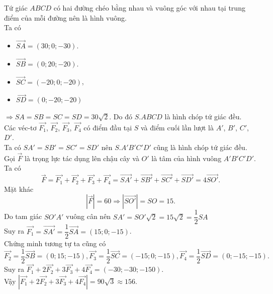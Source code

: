 \begin{bt}
{\begin{center}
	\end{center}
Tứ giác $ABCD$ có hai đường chéo bằng nhau và vuông góc với nhau tại trung điểm của mỗi đường nên là hình vuông.\\
Ta có
\begin{itemize}
	\item $\overrightarrow{SA}=\left(30;0;-30\right)$.
	\item $\overrightarrow{SB}=\left(0;20;-20\right)$.
	\item $\overrightarrow{SC}=\left(-20;0;-20\right)$,
	\item $\overrightarrow{SD}=\left(0;-20;-20\right)$
\end{itemize} 
$\Rightarrow SA=SB=SC=SD=30\sqrt{2}$. Do đó $S.ABCD$ là hình chóp tứ giác đều.\\
Các véc-tơ $\overrightarrow{F_1}$, $\overrightarrow{F_2}$, $\overrightarrow{F_3}$, $\overrightarrow{F_4}$ có điểm đầu tại $S$ và điểm cuối lần lượt là $A'$, $B'$, $C'$, $D'$.\\
Ta có $SA'=SB'=SC'=SD' $ nên $S.A'B'C'D'$ cũng là hình chóp tứ giác đều.\\
Gọi $\overrightarrow{F}$ là trọng lực tác dụng lên chậu cây và $O'$ là tâm của hình vuông $A'B'C'D'$. Ta có 
	\[\overrightarrow{F}=\overrightarrow{F_1}+\overrightarrow{F_2}+\overrightarrow{F_3}+\overrightarrow{F_4}=\overrightarrow{SA'}+\overrightarrow{SB'}+\overrightarrow{SC'}+\overrightarrow{SD'}=4\overrightarrow{SO'}.\]
Mặt khác
		\[\left|\overrightarrow{F}\right|=60\Rightarrow \left|\overrightarrow{SO'}\right|=SO=15.\]
		Do tam giác $SO'A'$ vuông cân nên $SA'=SO'\sqrt{2}=15\sqrt{2}=\dfrac{1}{2} SA$\\
		Suy ra $\overrightarrow{F_1}=\overrightarrow{SA'}=\dfrac{1}{2} \overrightarrow{SA}=\left(15;0;-15\right)$.\\
		Chứng minh tương tự ta cũng có
		\[\overrightarrow{F_2}=\dfrac{1}{2} \overrightarrow{SB}=\left(0;15;-15\right),\overrightarrow{F_3}=\dfrac{1}{2} \overrightarrow{SC}=\left(-15;0;-15\right),\overrightarrow{F_4}=\dfrac{1}{2} \overrightarrow{SD}=\left(0;-15;-15\right).
		\]
		Suy ra $\overrightarrow{F_1}+2\overrightarrow{F_2}+3\overrightarrow{F_3}+4\overrightarrow{F_4}=\left(-30;-30;-150\right)$.\\
		Vậy $ \left|\overrightarrow{F_1}+2\overrightarrow{F_2}+3\overrightarrow{F_3}+4\overrightarrow{F_4}\right|=90\sqrt{3} \approx 156$.
	}
\end{bt}

